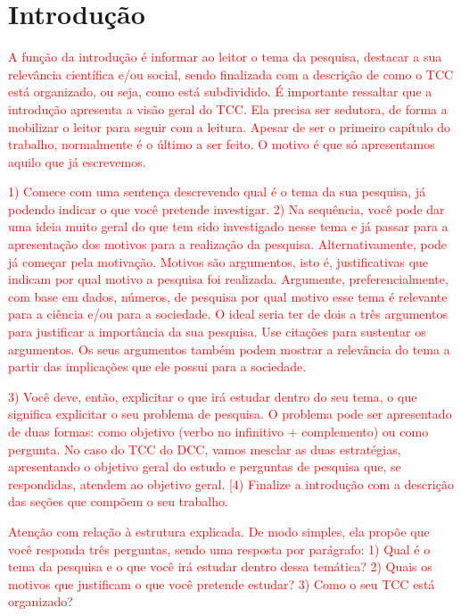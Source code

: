 \section{Introdução}
\label{sec:introducao}


\textcolor{red}{A função da introdução é informar ao leitor o tema da pesquisa, destacar a sua relevância científica e/ou social, sendo finalizada com a descrição de como o TCC está organizado, ou seja, como está subdividido. É importante ressaltar que a introdução apresenta a visão geral do TCC. Ela precisa ser sedutora, de forma a mobilizar o leitor para seguir com a leitura. Apesar de ser o primeiro capítulo do trabalho, normalmente é o último a ser feito. O motivo é que só apresentamos aquilo que já escrevemos.}

\textcolor{red}{1) Comece com uma sentença descrevendo qual é o tema da sua pesquisa, já podendo indicar o que você pretende investigar. 2) Na sequência, você pode dar uma ideia muito geral do que tem sido investigado nesse tema e já passar para a apresentação dos motivos para a realização da pesquisa. Alternativamente, pode já começar pela motivação. Motivos são argumentos, isto é, justificativas que indicam por qual motivo a pesquisa foi realizada. Argumente, preferencialmente, com base em dados, números, de pesquisa por qual motivo esse tema é relevante para a ciência e/ou para a sociedade. O ideal seria ter de dois a três argumentos para justificar a importância da sua pesquisa. Use citações para sustentar os argumentos. Os seus argumentos também podem mostrar a relevância do tema a partir das implicações que ele possui para a sociedade.}

\textcolor{red}{3) Você deve, então, explicitar o que irá estudar dentro do seu tema, o que significa explicitar o seu problema de pesquisa. O problema pode ser apresentado de duas formas: como objetivo (verbo no infinitivo + complemento) ou como pergunta. No caso do TCC do DCC, vamos mesclar as duas estratégias, apresentando o objetivo geral do estudo e perguntas de pesquisa que, se respondidas, atendem ao objetivo geral.
[4) Finalize a introdução com a descrição das seções que compõem o seu trabalho.}

\textcolor{red}{Atenção com relação à estrutura explicada. De modo simples, ela propõe que você responda três perguntas, sendo uma resposta por parágrafo: 1) Qual é o tema da pesquisa e o que você irá estudar dentro dessa temática? 2) Quais os motivos que justificam o que você pretende estudar? 3) Como o seu TCC está organizado?}

